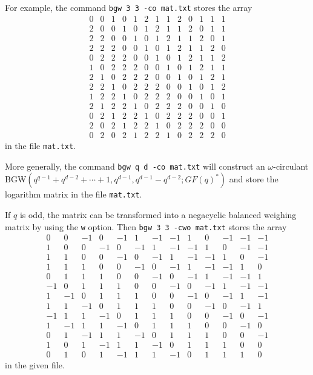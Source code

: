 \documentclass[a4paper,10pt]{article}
\begin{document}
For example, the command {\tt bgw 3 3 -co mat.txt} stores the array
\[
 \begin{array}{rrrrrrrrrrrrr}
0 & 0 & 1 & 0 & 1 & 2 & 1 & 1 & 2 & 0 & 1 & 1 & 1 \\
2 & 0 & 0 & 1 & 0 & 1 & 2 & 1 & 1 & 2 & 0 & 1 & 1 \\
2 & 2 & 0 & 0 & 1 & 0 & 1 & 2 & 1 & 1 & 2 & 0 & 1 \\
2 & 2 & 2 & 0 & 0 & 1 & 0 & 1 & 2 & 1 & 1 & 2 & 0 \\
0 & 2 & 2 & 2 & 0 & 0 & 1 & 0 & 1 & 2 & 1 & 1 & 2 \\
1 & 0 & 2 & 2 & 2 & 0 & 0 & 1 & 0 & 1 & 2 & 1 & 1 \\
2 & 1 & 0 & 2 & 2 & 2 & 0 & 0 & 1 & 0 & 1 & 2 & 1 \\
2 & 2 & 1 & 0 & 2 & 2 & 2 & 0 & 0 & 1 & 0 & 1 & 2 \\
1 & 2 & 2 & 1 & 0 & 2 & 2 & 2 & 0 & 0 & 1 & 0 & 1 \\
2 & 1 & 2 & 2 & 1 & 0 & 2 & 2 & 2 & 0 & 0 & 1 & 0 \\
0 & 2 & 1 & 2 & 2 & 1 & 0 & 2 & 2 & 2 & 0 & 0 & 1 \\
2 & 0 & 2 & 1 & 2 & 2 & 1 & 0 & 2 & 2 & 2 & 0 & 0 \\
0 & 2 & 0 & 2 & 1 & 2 & 2 & 1 & 0 & 2 & 2 & 2 & 0
\end{array}
\]
in the file {\tt mat.txt}. 

More generally, the command {\tt bgw q d -co mat.txt} will construct an $\omega$-circulant BGW$(q^{q-1}+q^{d-2}+\cdots+1,q^{d-1},q^{d-1}-q^{d-2};GF(q)^*)$ and store the logarithm matrix in the file {\tt mat.txt}.

If $q$ is odd, the matrix can be transformed into a negacyclic balanced weighing matrix by using the {\tt w} option. Then {\tt bgw 3 3 -cwo mat.txt} stores the array 
\[
\begin{array}{rrrrrrrrrrrrr}
0 & 0 & -1 & 0 & -1 & 1 & -1 & -1 & 1 & 0 & -1 & -1 & -1 \\
1 & 0 & 0 & -1 & 0 & -1 & 1 & -1 & -1 & 1 & 0 & -1 & -1 \\
1 & 1 & 0 & 0 & -1 & 0 & -1 & 1 & -1 & -1 & 1 & 0 & -1 \\
1 & 1 & 1 & 0 & 0 & -1 & 0 & -1 & 1 & -1 & -1 & 1 & 0 \\
0 & 1 & 1 & 1 & 0 & 0 & -1 & 0 & -1 & 1 & -1 & -1 & 1 \\
-1 & 0 & 1 & 1 & 1 & 0 & 0 & -1 & 0 & -1 & 1 & -1 & -1 \\
1 & -1 & 0 & 1 & 1 & 1 & 0 & 0 & -1 & 0 & -1 & 1 & -1 \\
1 & 1 & -1 & 0 & 1 & 1 & 1 & 0 & 0 & -1 & 0 & -1 & 1 \\
-1 & 1 & 1 & -1 & 0 & 1 & 1 & 1 & 0 & 0 & -1 & 0 & -1 \\
1 & -1 & 1 & 1 & -1 & 0 & 1 & 1 & 1 & 0 & 0 & -1 & 0 \\
0 & 1 & -1 & 1 & 1 & -1 & 0 & 1 & 1 & 1 & 0 & 0 & -1 \\
1 & 0 & 1 & -1 & 1 & 1 & -1 & 0 & 1 & 1 & 1 & 0 & 0 \\
0 & 1 & 0 & 1 & -1 & 1 & 1 & -1 & 0 & 1 & 1 & 1 & 0
\end{array}
\]
in the given file.
\end{document}

